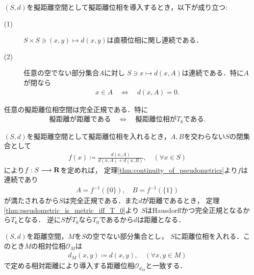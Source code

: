 	\begin{screen}
		\begin{thm}[擬距離関数の連続性]\label{thm:continuity_of_pseudometrics}
			$(S,d)$を擬距離空間として擬距離位相を導入するとき，以下が成り立つ:
			\begin{description}
				\item[(1)] $S \times S \ni (x,y) \longmapsto d(x,y)$は直積位相に関し連続である．
				
				\item[(2)] 任意の空でない部分集合$A$に対し
					$S \ni x \longmapsto d(x,A)$は連続である．特に$A$が閉なら
					\begin{align}
						x \in A \quad \Longleftrightarrow \quad
						d(x,A) = 0. 
					\end{align} 
			\end{description}
		\end{thm}
	\end{screen}
	
	\begin{screen}
		\begin{thm}[擬距離空間は完全正規]
			任意の擬距離位相空間は完全正規である．特に
			\begin{align}
				\mbox{擬距離が距離である} \quad \Longleftrightarrow \quad
				\mbox{擬距離位相が$T_6$である}.
			\end{align}
		\end{thm}
	\end{screen}
	
	\begin{prf}
		$(S,d)$を擬距離空間として擬距離位相を入れるとき，$A,B$を交わらない$S$の閉集合として
		\begin{align}
			f(x) \coloneqq \frac{d(x,A)}{d(x,A) + d(x,B)},
			\quad (\forall x \in S)
		\end{align}
		により$f:S \longrightarrow \mathbf{R}$を定めれば，
		定理\ref{thm:continuity_of_pseudometrics}より$f$は連続であり
		\begin{align}
			A = f^{-1}(\{0\}),\quad B = f^{-1}(\{1\})
		\end{align}
		が満たされるから$S$は完全正規である．また$d$が距離であるとき，
		定理\ref{thm:pseudometric_is_metric_iff_T_0}より
		$S$はHausdorffかつ完全正規となるから$T_6$となる．
		逆に$S$が$T_6$なら$T_0$であるから$d$は距離となる．
		\QED
	\end{prf}
	
	\begin{screen}
		\begin{thm}[距離空間の部分空間の距離]
			$(S,d)$を距離空間，$M$を$S$の空でない部分集合とし，
			$S$に距離位相を入れる．このとき$M$の相対位相$\mathscr{O}_M$は
			\begin{align}
				d_M(x,y) \coloneqq d(x,y),
				\quad (\forall x,y \in M)
			\end{align}
			で定める相対距離により導入する距離位相$\mathscr{O}_{d_M}$と一致する．
		\end{thm}
	\end{screen}
	
